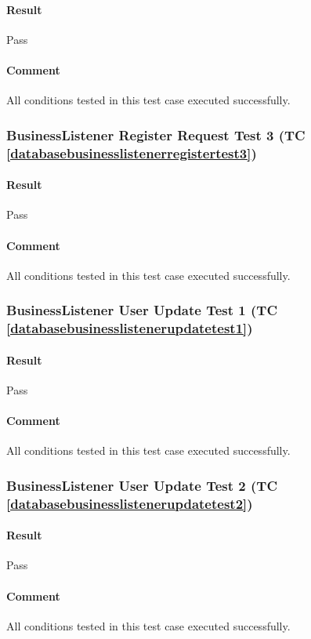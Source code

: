 \documentclass[hidelinks,english]{article}
\begin{document}
				\paragraph{Result} Pass
				\paragraph{Comment} All conditions tested in this test case executed successfully.
				
			\subsubsection{BusinessListener Register Request Test 3 (TC \ref{databasebusinesslistenerregistertest3})}
				\paragraph{Result} Pass
				\paragraph{Comment} All conditions tested in this test case executed successfully.
				
			\subsubsection{BusinessListener User Update Test 1 (TC \ref{databasebusinesslistenerupdatetest1})}
				\paragraph{Result} Pass
				\paragraph{Comment} All conditions tested in this test case executed successfully.
				
			\subsubsection{BusinessListener User Update Test 2 (TC \ref{databasebusinesslistenerupdatetest2})}
				\paragraph{Result} Pass
				\paragraph{Comment} All conditions tested in this test case executed successfully.
				
\end{document}
